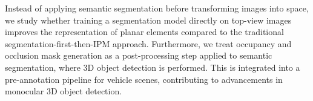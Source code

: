 Instead of applying semantic segmentation before transforming images into  space, we study whether training a segmentation model directly on top-view images improves the representation of planar elements compared to the traditional segmentation-first-then-IPM approach. Furthermore, we treat occupancy and occlusion mask generation as a post-processing step applied to  semantic segmentation, where 3D object detection is performed. This is integrated into a pre-annotation pipeline for vehicle scenes, contributing to advancements in monocular 3D object detection. 


